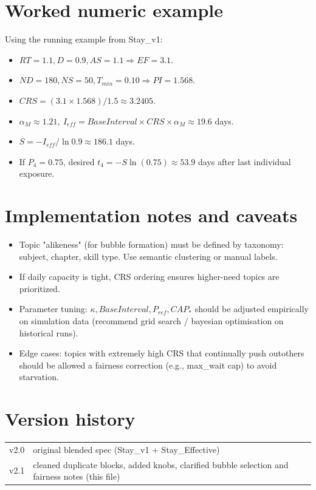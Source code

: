 \documentclass[11pt]{article}
\begin{document}
\section{Worked numeric example}
Using the running example from Stay\_v1:
\begin{itemize}
  \item $RT=1.1, D=0.9, AS=1.1 \Rightarrow EF=3.1$.
  \item $ND=180, NS=50, T_{min}=0.10 \Rightarrow PI=1.568$.
  \item $CRS = (3.1\times1.568)/1.5 \approx 3.2405$.
  \item $\alpha_M\approx 1.21,\ I_{eff}=BaseInterval\times CRS\times\alpha_M \approx 19.6$ days.
  \item $S = -I_{eff}/\ln 0.9 \approx 186.1$ days.
  \item If $P_4=0.75$, desired $t_4 = -S\ln(0.75) \approx 53.9$ days after last individual exposure.
\end{itemize}

\section{Implementation notes and caveats}
\begin{itemize}
  \item Topic "alikeness" (for bubble formation) must be defined by taxonomy: subject, chapter, skill type. Use semantic clustering or manual labels. 
  \item If daily capacity is tight, CRS ordering ensures higher-need topics are prioritized.
  \item Parameter tuning: $\kappa, BaseInterval, P_{ref}, CAP_{*}$ should be adjusted empirically on simulation data (recommend grid search / bayesian optimisation on historical runs).
  \item Edge cases: topics with extremely high CRS that continually push outothers should be allowed a fairness correction (e.g., max_wait cap) to avoid starvation.
\end{itemize}

\section{Version history}
\begin{tabular}{ll}
v2.0 & original blended spec (Stay\_v1 + Stay\_Effective) \\
v2.1 & cleaned duplicate blocks, added knobs, clarified bubble selection and fairness notes (this file)
\end{tabular}
\end{document}
